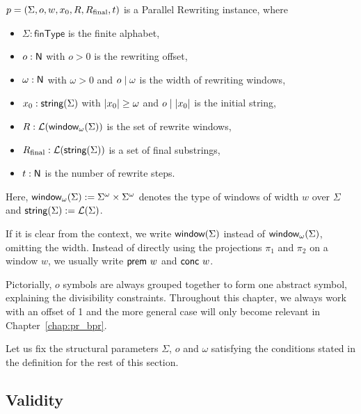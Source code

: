 \begin{definition}\label{def:pr}
  $p = (\Sigma, o, w, x_0, R, R_{\text{final}}, t)$ is a Parallel Rewriting instance, where 
  \begin{itemize}
    \item $\Sigma : \textsf{finType}$ is the finite alphabet,
    \item $o : \mathsf{N}$ with $o > 0$ is the rewriting offset,
    \item $\omega : \mathsf{N}$ with $\omega > 0$ and $o \mid \omega$ is the width of rewriting windows,
    \item $x_0 : \textsf{string}{(\Sigma)}$ with $|x_0| \ge \omega$ and $o \mid |x_0|$ is the initial string, 
    \item $R : \mathcal{L} (\textsf{window}_{\omega}{(\Sigma)})$ is the set of rewrite windows,
    \item $R_{\text{final}} : \mathcal{L} (\textsf{string}{(\Sigma)})$ is a set of final substrings,
    \item $t : \mathsf{N}$ is the number of rewrite steps.
  \end{itemize}
  Here, $\textsf{window}_{\omega}{(\Sigma)} := {\Sigma}^\omega \times {\Sigma}^\omega$\mnote{$\winw{\omega}{\Sigma}$} denotes the type of windows of width $w$ over $\Sigma$ and $\textsf{string}{(\Sigma)} := \mathcal{L} (\Sigma)$. 
\end{definition}
If it is clear from the context, we write $\textsf{window}{(\Sigma)}$ instead of $\winw{\omega}{\Sigma}$, omitting the width.
Instead of directly using the projections $\pi_1$ and $\pi_2$ on a window $w$, we usually write $\textsf{prem}~w$ and $\textsf{conc}~w$\mnote{$\prem{}, \conc{}$}. 

Pictorially, $o$ symbols are always grouped together to form one abstract symbol, explaining the divisibility constraints. Throughout this chapter, we always work with an offset of 1 and the more general case will only become relevant in Chapter~\ref{chap:pr_bpr}.

Let us fix the structural parameters $\Sigma$, $o$ and $\omega$ satisfying the conditions stated in the definition for the rest of this section.

\subsection{Validity}

